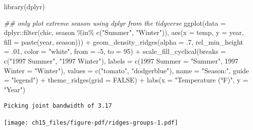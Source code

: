 \documentclass[
  letterpaper,
]{scrbook}
\newenvironment{Shaded}{\begin{snugshade}}{\end{snugshade}}
\newcommand{\AttributeTok}[1]{\textcolor[rgb]{0.40,0.45,0.13}{#1}}
\newcommand{\ConstantTok}[1]{\textcolor[rgb]{0.56,0.35,0.01}{#1}}
\newcommand{\DecValTok}[1]{\textcolor[rgb]{0.68,0.00,0.00}{#1}}
\newcommand{\DocumentationTok}[1]{\textcolor[rgb]{0.37,0.37,0.37}{\textit{#1}}}
\newcommand{\FunctionTok}[1]{\textcolor[rgb]{0.28,0.35,0.67}{#1}}
\newcommand{\NormalTok}[1]{\textcolor[rgb]{0.00,0.23,0.31}{#1}}
\newcommand{\OtherTok}[1]{\textcolor[rgb]{0.00,0.23,0.31}{#1}}
\newcommand{\SpecialCharTok}[1]{\textcolor[rgb]{0.37,0.37,0.37}{#1}}
\newcommand{\StringTok}[1]{\textcolor[rgb]{0.13,0.47,0.30}{#1}}
\begin{document}
\begin{Shaded}
\begin{Highlighting}[]
\FunctionTok{library}\NormalTok{(dplyr)}

\DocumentationTok{\#\# only plot extreme season using dplyr from the tidyverse}
\FunctionTok{ggplot}\NormalTok{(}\AttributeTok{data =}\NormalTok{ dplyr}\SpecialCharTok{::}\FunctionTok{filter}\NormalTok{(chic, season }\SpecialCharTok{\%in\%} \FunctionTok{c}\NormalTok{(}\StringTok{"Summer"}\NormalTok{, }\StringTok{"Winter"}\NormalTok{)),}
         \FunctionTok{aes}\NormalTok{(}\AttributeTok{x =}\NormalTok{ temp, }\AttributeTok{y =}\NormalTok{ year, }\AttributeTok{fill =} \FunctionTok{paste}\NormalTok{(year, season))) }\SpecialCharTok{+}
  \FunctionTok{geom\_density\_ridges}\NormalTok{(}\AttributeTok{alpha =}\NormalTok{ .}\DecValTok{7}\NormalTok{, }\AttributeTok{rel\_min\_height =}\NormalTok{ .}\DecValTok{01}\NormalTok{,}
                      \AttributeTok{color =} \StringTok{"white"}\NormalTok{, }\AttributeTok{from =} \SpecialCharTok{{-}}\DecValTok{5}\NormalTok{, }\AttributeTok{to =} \DecValTok{95}\NormalTok{) }\SpecialCharTok{+}
  \FunctionTok{scale\_fill\_cyclical}\NormalTok{(}\AttributeTok{breaks =} \FunctionTok{c}\NormalTok{(}\StringTok{"1997 Summer"}\NormalTok{, }\StringTok{"1997 Winter"}\NormalTok{),}
                      \AttributeTok{labels =} \FunctionTok{c}\NormalTok{(}\StringTok{\textasciigrave{}}\AttributeTok{1997 Summer}\StringTok{\textasciigrave{}} \OtherTok{=} \StringTok{"Summer"}\NormalTok{,}
                                 \StringTok{\textasciigrave{}}\AttributeTok{1997 Winter}\StringTok{\textasciigrave{}} \OtherTok{=} \StringTok{"Winter"}\NormalTok{),}
                      \AttributeTok{values =} \FunctionTok{c}\NormalTok{(}\StringTok{"tomato"}\NormalTok{, }\StringTok{"dodgerblue"}\NormalTok{),}
                      \AttributeTok{name =} \StringTok{"Season:"}\NormalTok{, }\AttributeTok{guide =} \StringTok{"legend"}\NormalTok{) }\SpecialCharTok{+}
  \FunctionTok{theme\_ridges}\NormalTok{(}\AttributeTok{grid =} \ConstantTok{FALSE}\NormalTok{) }\SpecialCharTok{+}
  \FunctionTok{labs}\NormalTok{(}\AttributeTok{x =} \StringTok{"Temperature (°F)"}\NormalTok{, }\AttributeTok{y =} \StringTok{"Year"}\NormalTok{)}
\end{Highlighting}
\end{Shaded}

\begin{verbatim}
Picking joint bandwidth of 3.17
\end{verbatim}

\texttt{[image: ch15\_files/figure-pdf/ridges-groups-1.pdf]}
\end{document}
